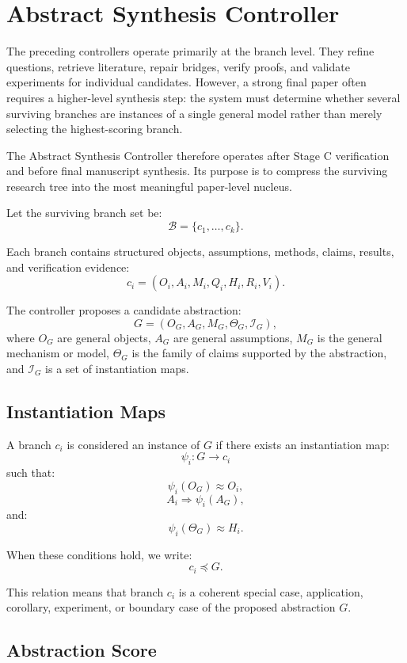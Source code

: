 \documentclass[11pt]{article}
\begin{document}
\section{Abstract Synthesis Controller}

The preceding controllers operate primarily at the branch level. They refine questions, retrieve literature, repair bridges, verify proofs, and validate experiments for individual candidates. However, a strong final paper often requires a higher-level synthesis step: the system must determine whether several surviving branches are instances of a single general model rather than merely selecting the highest-scoring branch.

The Abstract Synthesis Controller therefore operates after Stage C verification and before final manuscript synthesis. Its purpose is to compress the surviving research tree into the most meaningful paper-level nucleus.

Let the surviving branch set be:
$$
\mathcal{B}=\{c_1,\dots,c_k\}.
$$

Each branch contains structured objects, assumptions, methods, claims, results, and verification evidence:
$$
c_i=(O_i,A_i,M_i,Q_i,H_i,R_i,V_i).
$$

The controller proposes a candidate abstraction:
$$
G=(O_G,A_G,M_G,\Theta_G,\mathcal{I}_G),
$$
where $O_G$ are general objects, $A_G$ are general assumptions, $M_G$ is the general mechanism or model, $\Theta_G$ is the family of claims supported by the abstraction, and $\mathcal{I}_G$ is a set of instantiation maps.

\subsection{Instantiation Maps}

A branch $c_i$ is considered an instance of $G$ if there exists an instantiation map:
$$
\psi_i:G\rightarrow c_i
$$
such that:
$$
\psi_i(O_G)\approx O_i,
$$
$$
A_i \Rightarrow \psi_i(A_G),
$$
and:
$$
\psi_i(\Theta_G)\approx H_i.
$$

When these conditions hold, we write:
$$
c_i\preceq G.
$$

This relation means that branch $c_i$ is a coherent special case, application, corollary, experiment, or boundary case of the proposed abstraction $G$.

\subsection{Abstraction Score}
\end{document}

